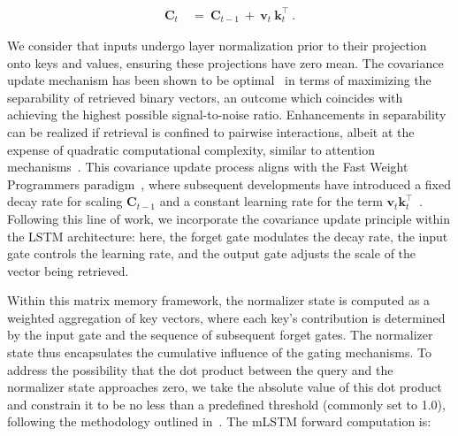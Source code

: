 \begin{align}
\mathbf{C}_t \ &= \ \mathbf{C}_{t-1} \ + \ \mathbf{v}_{t} \ \mathbf{k}_t^\top \ .
\end{align}

We consider that inputs undergo layer normalization prior to their projection onto keys and values, ensuring these projections have zero mean. The covariance update mechanism has been shown to be optimal~\citep{Dayan:91} in terms of maximizing the separability of retrieved binary vectors, an outcome which coincides with achieving the highest possible signal-to-noise ratio. Enhancements in separability can be realized if retrieval is confined to pairwise interactions, albeit at the expense of quadratic computational complexity, similar to attention mechanisms~\citep{Krotov:16,Krotov:17,Ramsauer:21}. This covariance update process aligns with the Fast Weight Programmers paradigm~\citep{Schmidhuber:92ncfastweights,Schlag:21}, where subsequent developments have introduced a fixed decay rate for scaling $\mathbf{C}_{t-1}$ and a constant learning rate for the term 
$\mathbf{v}_{t} \mathbf{k}_t ^\top$~\citep{Ba:16}. Following this line of work, we incorporate the covariance update principle within the LSTM architecture: here, the forget gate modulates the decay rate, the input gate controls the learning rate, and the output gate adjusts the scale of the vector being retrieved.

Within this matrix memory framework, the normalizer state is computed as a weighted aggregation of key vectors, where each key's contribution is determined by the input gate and the sequence of subsequent forget gates. The normalizer state thus encapsulates the cumulative influence of the gating mechanisms. To address the possibility that the dot product between the query and the normalizer state approaches zero, we take the absolute value of this dot product and constrain it to be no less than a predefined threshold (commonly set to 1.0), following the methodology outlined in~\citep{Sun:23arxiv}. The mLSTM forward computation is:


